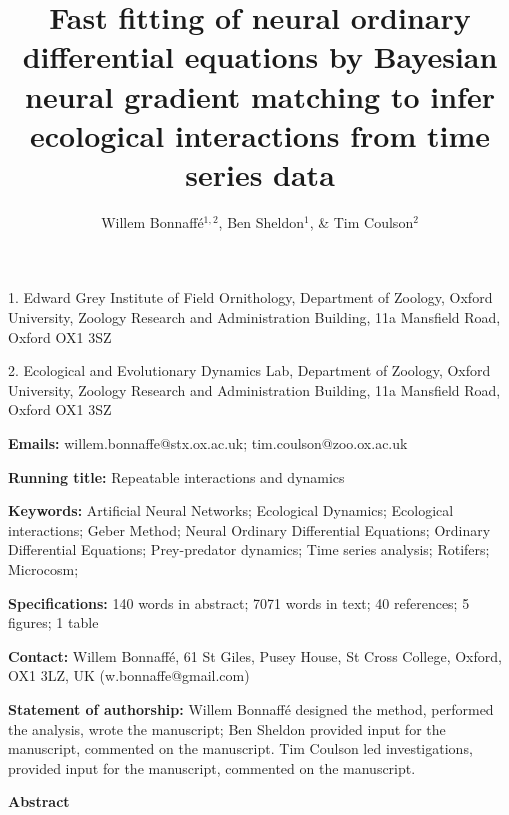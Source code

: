 \documentclass[11pt, oneside]{article}
\title{Fast fitting of neural ordinary differential equations by Bayesian neural gradient matching to infer ecological interactions from time series data}
\author{Willem Bonnaff\'e$^{1,2}$, Ben Sheldon$^1$, \& Tim Coulson$^2$}
\date{}
\begin{document}
\maketitle
{}

1. Edward Grey Institute of Field Ornithology, Department of Zoology, Oxford University, Zoology Research and Administration Building, 11a Mansfield Road, Oxford OX1 3SZ 

2. Ecological and Evolutionary Dynamics Lab, Department of Zoology, Oxford University, Zoology Research and Administration Building, 11a Mansfield Road, Oxford OX1 3SZ 

\textbf{Emails:}
willem.bonnaffe@stx.ox.ac.uk;
tim.coulson@zoo.ox.ac.uk

\textbf{Running title:}
Repeatable interactions and dynamics

\textbf{Keywords:}
Artificial Neural Networks;
Ecological Dynamics;  
Ecological interactions;
Geber Method; 
Neural Ordinary Differential Equations; 
Ordinary Differential Equations; 
Prey-predator dynamics; 
Time series analysis;
Rotifers;
Microcosm;


\textbf{Specifications:}  140 words in abstract; 7071 words in text; 40 references; 5 figures; 1 table

\textbf{Contact:}
Willem Bonnaff\'e, 61 St Giles, Pusey House, St Cross College, Oxford, OX1 3LZ, UK (w.bonnaffe@gmail.com)

\textbf{Statement of authorship:}
Willem Bonnaff\'e designed the method, performed the analysis, wrote the manuscript; 
Ben Sheldon provided input for the manuscript, commented on the manuscript.
Tim Coulson led investigations, provided input for the manuscript, commented on the manuscript.


\newpage
{}

\textbf{Abstract} 
\end{document}

